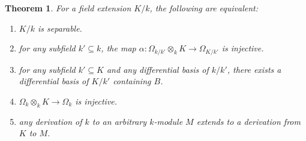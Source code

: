 \documentclass[10pt]{article}
\theoremstyle{thmstyle}
\newtheorem{theorem}{Theorem}[section]
\theoremstyle{defstyle}
\begin{document}
\begin{theorem}
    For a field extension $K/k$, the following are equivalent:
    \begin{enumerate}[label=(\arabic*)]
        \item $K/k$ is separable. 
        \item for any subfield $k'\subseteq k$, the map $\alpha\colon \Omega_{k/k'}\otimes_k K\to\Omega_{K/k'}$ is injective. 
        \item for any subfield $k'\subseteq K$ and any differential basis of $k/k'$, there exists a differential basis of $K/k'$ containing $B$. 
        \item $\Omega_{k}\otimes_k K\to \Omega_k$ is injective. 
        \item any derivation of $k$ to an arbitrary $k$-module $M$ extends to a derivation from $K$ to $M$.
    \end{enumerate}
\end{theorem}
\end{document}
